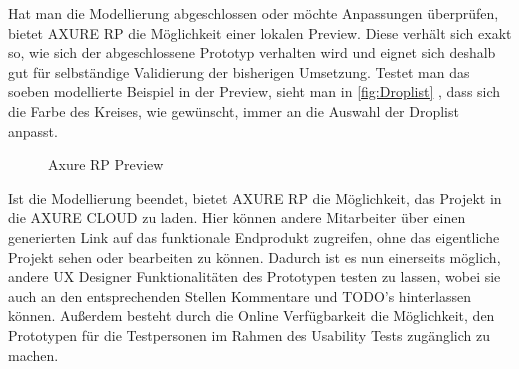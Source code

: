 Hat man die Modellierung abgeschlossen oder möchte Anpassungen überprüfen, bietet AXURE RP die Möglichkeit einer lokalen Preview.
Diese verhält sich exakt so, wie sich der abgeschlossene Prototyp verhalten wird und eignet sich deshalb gut für selbständige Validierung der bisherigen Umsetzung.
Testet man das soeben modellierte Beispiel in der Preview, sieht man in \cref{fig:Droplist} , dass sich die Farbe des Kreises, wie gewünscht, immer an die Auswahl der Droplist anpasst.
\begin{figure}%
\centering
{}%
\qquad
{}%
\qquad
{}%
\qquad
{}%

\caption{Axure RP Preview}%
\label{fig:Preview}
\end{figure}

Ist die Modellierung beendet, bietet AXURE RP die Möglichkeit, das Projekt in die AXURE CLOUD zu laden.
Hier können andere Mitarbeiter über einen generierten Link auf das funktionale Endprodukt zugreifen, ohne das eigentliche Projekt sehen oder bearbeiten zu können.
Dadurch ist es nun einerseits möglich, andere UX Designer Funktionalitäten des Prototypen testen zu lassen, wobei sie auch an den entsprechenden Stellen Kommentare und TODO's hinterlassen können.
Außerdem besteht durch die Online Verfügbarkeit die Möglichkeit, den Prototypen für die Testpersonen im Rahmen des Usability Tests zugänglich zu machen.

